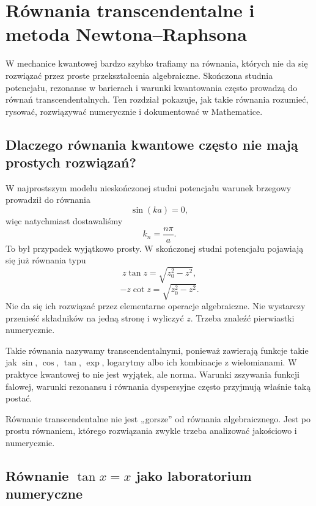 \chapter{Równania transcendentalne i metoda Newtona--Raphsona}

\begin{summarybox}
W mechanice kwantowej bardzo szybko trafiamy na równania, których nie da się
rozwiązać przez proste przekształcenia algebraiczne. Skończona studnia
potencjału, rezonanse w barierach i warunki kwantowania często prowadzą do
równań transcendentalnych. Ten rozdział pokazuje, jak takie równania rozumieć,
rysować, rozwiązywać numerycznie i dokumentować w Mathematice.
\end{summarybox}

\section{Dlaczego równania kwantowe często nie mają prostych rozwiązań?}

W najprostszym modelu nieskończonej studni potencjału warunek brzegowy prowadził do równania
\[
    \sin(ka)=0,
\]
więc natychmiast dostawaliśmy
\[
    k_n=\frac{n\pi}{a}.
\]
To był przypadek wyjątkowo prosty. W skończonej studni potencjału pojawiają się już równania typu
\begin{equation}
    z\tan z=\sqrt{z_0^2-z^2},
\end{equation}
\begin{equation}
    -z\cot z=\sqrt{z_0^2-z^2}.
\end{equation}
Nie da się ich rozwiązać przez elementarne operacje algebraiczne. Nie wystarczy przenieść składników na jedną stronę i wyliczyć \(z\). Trzeba znaleźć pierwiastki numerycznie.

Takie równania nazywamy transcendentalnymi, ponieważ zawierają funkcje takie jak \(\sin\), \(\cos\), \(\tan\), \(\exp\), logarytmy albo ich kombinacje z wielomianami. W praktyce kwantowej to nie jest wyjątek, ale norma. Warunki zszywania funkcji falowej, warunki rezonansu i równania dyspersyjne często przyjmują właśnie taką postać.

\begin{remarkbox}
Równanie transcendentalne nie jest „gorsze” od równania algebraicznego. Jest po prostu równaniem, którego rozwiązania zwykle trzeba analizować jakościowo i numerycznie.
\end{remarkbox}

\section{Równanie \texorpdfstring{\(\tan x=x\)}{tan x = x} jako laboratorium numeryczne}


